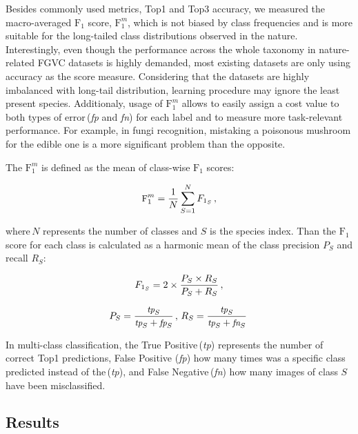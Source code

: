 \documentclass[10pt,twocolumn,letterpaper]{article}
\begin{document}
Besides commonly used metrics, Top1 and Top3 accuracy, we measured the macro-averaged $\text{F}_1$ score, $\text{F}_{1}^{m}$, which is not biased by class frequencies and is more suitable for the long-tailed class distributions observed in the nature. Interestingly, even though the performance across the whole taxonomy in nature-related FGVC datasets is highly demanded, most existing datasets are only using accuracy as the score measure. Considering that the datasets are highly imbalanced with long-tail distribution, learning procedure may ignore the least present species. Additionaly, usage of $\text{F}_{1}^{m}$ allows to easily assign a cost value to both types of error\,({\it fp} and {\it fn}) for each label and to measure more task-relevant performance. For example, in fungi recognition, mistaking a poisonous mushroom for the edible one is a more significant problem than the opposite. 

The $\text{F}_{1}^{m}$ is defined as the mean of class-wise $\text{F}_1$ scores:

\begin{equation}
\small
\text{F}_{1}^{m} = \frac{1}{N} \sum_{S=1}^{N} F_{1_{S}}\,,
\label{eq:F1_macro}
\end{equation}

where\,$N$ represents the number of classes and $S$ is the species index. Than the $\text{F}_1$ score for each class is calculated as a harmonic mean of the class precision $P_S$ and recall $R_S$:

\begin{equation}
\small
F_{1_{S}} = 2 \times \frac{{P_S} \times {R_S}}{P_S + R_S}\,,
\label{eq:F1_i}
\end{equation}

\begin{equation}
\small
P_S=\frac{\text{\it tp}_S}{\text{\it tp}_S+\text{\it fp}_S}\,,\,R_S=\frac{\text{\it tp}_S}{\text{\it tp}_S+\text{\it fn}_S}\,
\label{eq:precisionrecall}
\end{equation}

In multi-class classification, the True Positive\,({\it tp}) represents the number of correct Top1 predictions, False Positive ({\it fp}) how many times was a specific class predicted instead of the\,({\it tp}), and False Negative\,({\it fn}) how many images of class $S$ have been misclassified.





\subsection{Results}
\label{results}
\end{document}
